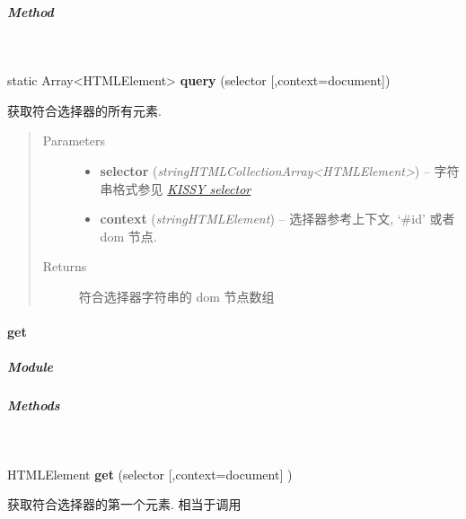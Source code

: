 \documentclass[letterpaper,10pt,english]{sphinxmanual}
\begin{document}
\subparagraph{Method}
\label{api/core/dom/query:method}

\begin{fulllineitems}
\label{api/core/dom/query:DOM.query}~
\begin{DUlineblock}{0em}
\item[] static Array\textless{}HTMLElement\textgreater{} \textbf{query} (selector {[},context=document{]})
\item[] 获取符合选择器的所有元素.
\end{DUlineblock}
\begin{quote}\begin{description}
\item[{Parameters}] \leavevmode\begin{itemize}
\item {}
\textbf{selector} (\emph{string\textbar{}HTMLCollection\textbar{}Array\textless{}HTMLElement\textgreater{}}) -- 字符串格式参见 {\hyperref[api/core/dom/selector:dom-selector]{\emph{KISSY selector}}}

\item {}
\textbf{context} (\emph{string\textbar{}HTMLElement}) -- 选择器参考上下文, `\#id' 或者 dom 节点.

\end{itemize}

\item[{Returns}] \leavevmode
符合选择器字符串的 dom 节点数组

\end{description}\end{quote}

\end{fulllineitems}



\paragraph{get}
\label{api/core/dom/get::doc}\label{api/core/dom/get:get}

\subparagraph{Module}
\label{api/core/dom/get:module}\begin{quote}

{\hyperref[api/core/dom/index:module-DOM]{}}
\end{quote}


\subparagraph{Methods}
\label{api/core/dom/get:methods}

\begin{fulllineitems}
\label{api/core/dom/get:DOM.get}~
\begin{DUlineblock}{0em}
\item[] HTMLElement \textbf{get} (selector {[},context=document{]} )
\item[] 获取符合选择器的第一个元素. 相当于调用 {\hyperref[api/core/dom/query:DOM.query]{}}
\end{DUlineblock}

\end{fulllineitems}
\end{document}
